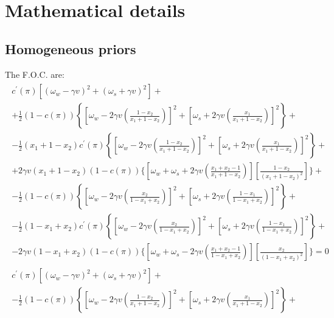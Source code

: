 \documentclass[12pt,a4paper]{article}
\begin{document}
\appendix

\section{Mathematical details}
\label{math}

\subsection{Homogeneous priors}
The F.O.C. are:
\begin{eqnarray}
\label{focx1gen}
    \begin{split}
        c^\prime(\pi)\left[(\omega_w-\gamma v)^2+(\omega_s+\gamma v)^2\right]+ \\
        +\frac{1}{2}(1-c(\pi))\left\{\left[\omega_w-2\gamma v\left(\frac{1-x_2}{x_1+1-x_2}\right)\right]^2+\left[\omega_s+2\gamma v\left(\frac{x_1}{x_1+1-x_2}\right)\right]^2\right\}+ \\
        -\frac{1}{2}(x_1 + 1-x_2)c^\prime(\pi)\left\{\left[\omega_w-2\gamma v\left(\frac{1-x_2}{x_1+1-x_2}\right)\right]^2+\left[\omega_s+2\gamma v\left(\frac{x_1}{x_1+1-x_2}\right)\right]^2\right\}+ \\
        +2\gamma v(x_1 + 1-x_2)(1-c(\pi))\Bigg\{\left[\omega_w+\omega_s+2\gamma v\left(\frac{x_1+x_2-1}{x_1+1-x_2}\right)\right]\left[\frac{1-x_2}{(x_1+1-x_2)^2}\right]\Bigg\}+\\
        -\frac{1}{2}(1-c(\pi))\left\{\left[\omega_w-2\gamma v\left(\frac{x_2}{1-x_1+x_2}\right)\right]^2+\left[\omega_s+2\gamma v\left(\frac{1-x_1}{1-x_1+x_2}\right)\right]^2\right\}+\\
        -\frac{1}{2}(1-x_1 + x_2)c^\prime(\pi)\left\{\left[\omega_w-2\gamma v\left(\frac{x_2}{1-x_1+x_2}\right)\right]^2+\left[\omega_s+2\gamma v\left(\frac{1-x_1}{1-x_1+x_2}\right)\right]^2\right\}+\\
        -2\gamma v(1-x_1 + x_2)(1-c(\pi))\Bigg\{\left[\omega_w+\omega_s-2\gamma v\left(\frac{x_1+x_2-1}{1-x_1+x_2}\right)\right]\left[\frac{x_2}{(1-x_1+x_2)^2}\right]\Bigg\}=0
    \end{split} \\
    \label{focx2gen}
    \begin{split}
        c^\prime(\pi)\left[(\omega_w-\gamma v)^2+(\omega_s+\gamma v)^2\right]+ \\
        -\frac{1}{2}(1-c(\pi))\left\{\left[\omega_w-2\gamma v\left(\frac{1-x_2}{x_1+1-x_2}\right)\right]^2+\left[\omega_s+2\gamma v\left(\frac{x_1}{x_1+1-x_2}\right)\right]^2\right\}+ \\

\end{split}
\end{eqnarray}
\end{document}

